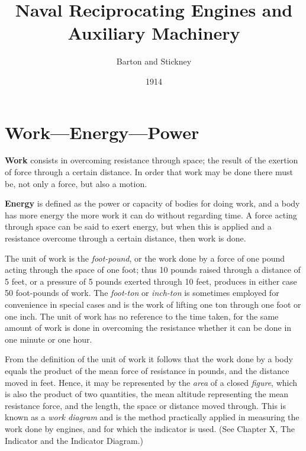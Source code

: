 \documentclass[11pt, a5paper]{book}
\begin{document}
\renewcommand{\thechapter}{\Roman{chapter}}
\title{Naval Reciprocating Engines and Auxiliary Machinery}
\author{Barton and Stickney}
\date{1914}
\maketitle


\chapter{Work---Energy---Power}
\textbf{Work} consists in overcoming resistance through space; the
result of the exertion of force through a certain distance.  In order
that work may be done there must be, not only a force, but also a
motion.\par

\textbf{Energy} is defined as the power or capacity of bodies for
doing work, and a body has more energy the more work it can do without
regarding time.  A force acting through space can be said to exert
energy, but when this is applied and a resistance overcome through a
certain distance, then work is done.\par

The unit of work is the \textit{foot-pound}, or the work done by a
force of one pound acting through the space of one foot; thus 10
pounds raised through a distance of 5 feet, or a pressure of 5 pounds
exerted through 10 feet, produces in either case 50 foot-pounds of
work.  The \textit{foot-ton} or \textit{inch-ton} is sometimes
employed for convenience in special cases and is the work of lifting
one ton through one foot or one inch.  The unit of work has no
reference to the time taken, for the same amount of work is done in
overcoming the resistance whether it can be done in one minute or one
hour.\par

From the definition of the unit of work it follows that the work done
by a body equals the product of the mean force of resistance in
pounds, and the distance moved in feet.  Hence, it may be represented
by the \textit{area} of a closed \textit{figure}, which is also the
product of two quantities, the mean altitude representing the mean
resistance force, and the length, the space or distance moved through.
This is known as a \textit{work diagram} and is the method practically
applied in measuring the work done by engines, and for which the
indicator is used.  (See Chapter X, The Indicator and the Indicator
Diagram.)\par
\end{document}
